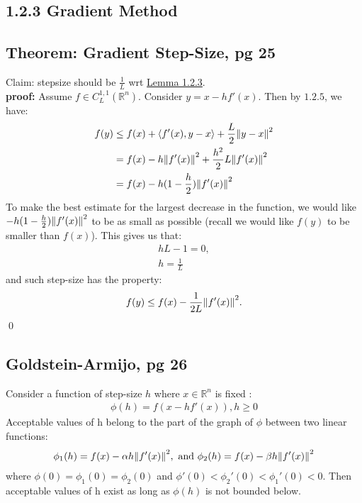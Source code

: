 \documentclass[12pt,a4paper]{article}
\begin{document}
	\subsection*{1.2.3 Gradient Method}\label{sec123}
	\subsection*{Theorem: Gradient Step-Size, pg 25}\label{thmgradstep}
	Claim: stepsize should be $\frac{1}{L}$ wrt \hyperref[lem123]{Lemma 1.2.3}.\\
	\textbf{proof:} Assume $f \in C_L^{1,1}(\mathbb{R}^n)$. Consider $y = x - hf'(x)$. Then by $1.2.5$, we have:
	\begin{align*}
		f(y) &\leq f(x) + \langle f'(x), y-x \rangle + \frac{L}{2}\norm{y-x}^2 \\
		&= f(x) - h \norm{f'(x)}^2 + \frac{h^2}{2}L \norm{f'(x)}^2 \\
		&= f(x) - h(1 - \frac{h}{2})\norm{f'(x)}^2
	\end{align*}
	To make the best estimate for the largest decrease in the function, we would like $-h(1-\frac{h}{2}) \norm{f'(x)}^2$ to be as small as possible (recall we would like $f(y)$ to be smaller than $f(x)$). This gives us that:
	\begin{align*}
		hL - 1 = 0, \\
		h = \frac{1}{L}
	\end{align*}
	and such step-size has the property:
	\begin{align*}
		f(y) \leq f(x) - \frac{1}{2L}\norm{f'(x)}^2.
	\end{align*}
	\qed
	
	\subsection*{Goldstein-Armijo, pg 26}\label{GAbound}
	Consider a function of step-size $h$ where $x \in \mathbb{R}^n$ is fixed :
	\begin{align*}
		\phi(h) = f(x - hf'(x)), h \geq 0
	\end{align*}
	Acceptable values of h belong to the part of the graph of $\phi$ between two linear functions:
	\begin{align*}
		\phi_1(h) = f(x) - \alpha h \norm{f'(x)}^2, \text{  and   } \phi_2(h) = f(x) - \beta h \norm{f'(x)}^2
	\end{align*}
	where $\phi(0) = \phi_1(0) = \phi_2(0)$ and $\phi'(0) < \phi_2'(0) < \phi_1'(0) < 0$. Then acceptable values of h exist as long as $\phi(h)$ is not bounded below.\\
	
\end{document}
